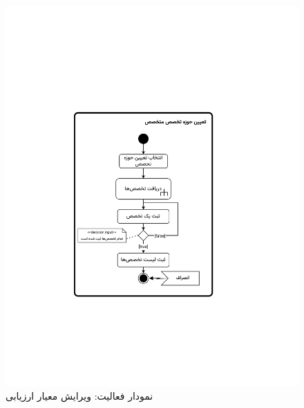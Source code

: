 \begin{figure}
	\centering
	\includegraphics[scale=0.8, page=10]{figs/OOD-activity21-30.pdf}
	\caption{نمودار فعالیت: ویرایش معیار ارزیابی}
\end{figure}
\FloatBarrier
\newpage

